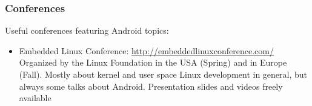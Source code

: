 \begin{frame}
  \frametitle{Conferences}
  Useful conferences featuring Android topics:
  \begin{itemize}
  \item Embedded Linux Conference: \url{http://embeddedlinuxconference.com/}\\
    Organized by the Linux Foundation in the USA (Spring)
    and in Europe (Fall). Mostly about kernel and user space Linux
    development in general, but always some talks about
    Android. Presentation slides and videos freely available
  \end{itemize}
\end{frame}
